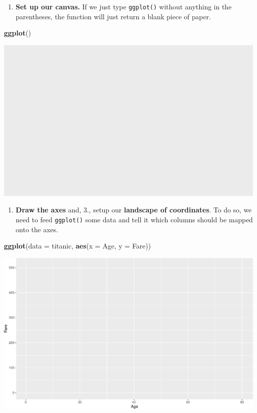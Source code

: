 \documentclass[
]{book}
\newenvironment{Shaded}{\begin{snugshade}}{\end{snugshade}}
\newcommand{\DataTypeTok}[1]{\textcolor[rgb]{0.13,0.29,0.53}{#1}}
\newcommand{\KeywordTok}[1]{\textcolor[rgb]{0.13,0.29,0.53}{\textbf{#1}}}
\newcommand{\NormalTok}[1]{#1}
\providecommand{\tightlist}{%
  \setlength{\itemsep}{0pt}\setlength{\parskip}{0pt}}
\begin{document}
\begin{enumerate}
\def\labelenumi{(\arabic{enumi})}
\tightlist
\item
  \textbf{Set up our canvas.} If we just type \texttt{ggplot()} without anything in the parentheses, the function will just return a blank piece of paper.
\end{enumerate}

\begin{Shaded}
\begin{Highlighting}[]
\KeywordTok{ggplot}\NormalTok{()}
\end{Highlighting}
\end{Shaded}

\includegraphics{figures/unnamed-chunk-246-1.pdf}

\begin{enumerate}
\def\labelenumi{(\arabic{enumi})}
\setcounter{enumi}{1}
\tightlist
\item
  \textbf{Draw the axes} and, 3., setup our \textbf{landscape of coordinates}. To do so, we need to feed \texttt{ggplot()} some data and tell it which columns should be mapped onto the axes.
\end{enumerate}

\begin{Shaded}
\begin{Highlighting}[]
\KeywordTok{ggplot}\NormalTok{(}\DataTypeTok{data =}\NormalTok{ titanic, }
       \KeywordTok{aes}\NormalTok{(}\DataTypeTok{x =}\NormalTok{ Age, }\DataTypeTok{y =}\NormalTok{ Fare))}
\end{Highlighting}
\end{Shaded}

\includegraphics{figures/unnamed-chunk-247-1.pdf}
\end{document}
